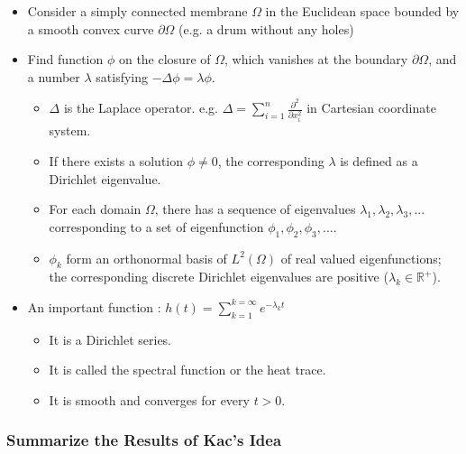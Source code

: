      \begin{itemize}     
       \item Consider a simply connected membrane $\Omega$ in the Euclidean space bounded by a smooth convex curve $\partial \Omega$ (e.g. a drum without any holes)
       \item Find function $\phi$ on the closure of $\Omega$, which vanishes at the boundary $\partial \Omega$, and a number $\lambda$ satisfying $-\Delta \phi = \lambda \phi$.

         \begin{itemize}
           \item $\Delta$ is the Laplace operator. e.g. $\Delta = \sum_{i=1}^{n} \frac{\partial ^2}{\partial x_i^2}$ in Cartesian coordinate system.
           \item If there exists a solution $\phi \neq 0$, the corresponding $\lambda$ is defined as a Dirichlet eigenvalue.
           \item For each domain $\Omega$, there has a sequence of eigenvalues $\lambda_1, \lambda_2, \lambda_3, ... $ corresponding to a set of eigenfunction $\phi_1, \phi_2, \phi_3, ...$.
           \item $\phi_k$ form an orthonormal basis of $L^2(\Omega)$ of real valued eigenfunctions; the corresponding discrete Dirichlet eigenvalues are positive ($\lambda_k \in \mathbb{R^{+}}$).
         \end{itemize}
         
       \item An important function \cite{grieser2013hearing}: $h(t) = \sum_{k=1}^{k=\infty} e^{-\lambda_kt}$
         \begin{itemize}  
           \item It is a Dirichlet series.
           \item It is called the spectral function or the heat trace.
           \item It is smooth and converges for every $t>0$.
         \end{itemize}
     \end{itemize}
     
        
    \subsubsection{Summarize the Results of Kac's Idea}
     
